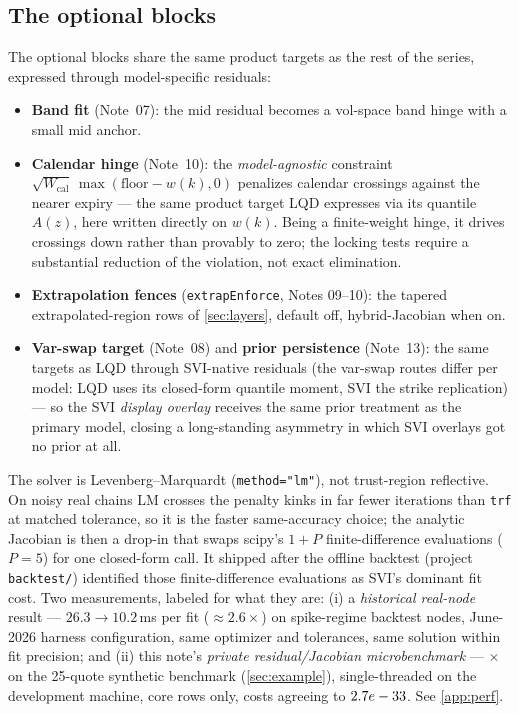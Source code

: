\documentclass[11pt]{article}
\begin{document}
\subsection{The optional blocks}

The optional blocks share the same product targets as the rest of the series,
expressed through model-specific residuals:
\begin{itemize}[leftmargin=1.4em]
\item \textbf{Band fit} (Note~07): the mid residual becomes a vol-space band
hinge with a small mid anchor.
\item \textbf{Calendar hinge} (Note~10): the \emph{model-agnostic} constraint
$\sqrt{W_{\text{cal}}}\,\max(\text{floor}-w(k),0)$ penalizes calendar
crossings against the nearer expiry --- the same product target LQD expresses
via its quantile $A(z)$, here written directly on $w(k)$. Being a
finite-weight hinge, it drives crossings down rather than provably to zero;
the locking tests require a substantial reduction of the violation, not exact
elimination.
\item \textbf{Extrapolation fences} (\texttt{extrapEnforce}, Notes 09--10):
the tapered extrapolated-region rows of \cref{sec:layers}, default off,
hybrid-Jacobian when on.
\item \textbf{Var-swap target} (Note~08) and \textbf{prior persistence}
(Note~13): the same targets as LQD through SVI-native residuals (the var-swap
routes differ per model: LQD uses its closed-form quantile moment, SVI the
strike replication) --- so the SVI \emph{display overlay} receives the same
prior treatment as the primary model, closing a long-standing asymmetry in
which SVI overlays got no prior at all.
\end{itemize}

\begin{perfbox}
The solver is Levenberg--Marquardt (\texttt{method="lm"}), not trust-region
reflective. On noisy real chains LM crosses the penalty kinks in far fewer
iterations than \texttt{trf} at matched tolerance, so it is the faster
same-accuracy choice; the analytic Jacobian is then a drop-in that swaps scipy's
$1+P$ finite-difference evaluations ($P=5$) for one closed-form call. It
shipped after the offline backtest (project \texttt{backtest/}) identified
those finite-difference evaluations as SVI's dominant fit cost. Two
measurements, labeled for what they are: (i) a \emph{historical real-node}
result --- $26.3\to10.2$\,ms per fit ($\approx2.6\times$) on spike-regime
backtest nodes, June-2026 harness configuration, same optimizer and
tolerances, same solution within fit precision; and (ii) this note's
\emph{private residual/Jacobian microbenchmark} --- \svispeedup$\times$ on the
25-quote synthetic benchmark (\cref{sec:example}), single-threaded on the
development machine, core rows only, costs agreeing to $2.7e-33$. See
\cref{app:perf}.
\end{perfbox}
\end{document}
